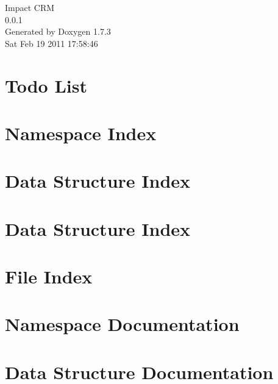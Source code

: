 \documentclass[a4paper]{book}
\begin{document}
\hypersetup{pageanchor=false}
\begin{titlepage}
\vspace*{7cm}
\begin{center}
{\Large Impact CRM \\[1ex]\large 0.0.1 }\\
\vspace*{1cm}
{\large Generated by Doxygen 1.7.3}\\
\vspace*{0.5cm}
{\small Sat Feb 19 2011 17:58:46}\\
\end{center}
\end{titlepage}
\clearemptydoublepage
{}
\tableofcontents
\clearemptydoublepage
{}
\hypersetup{pageanchor=true}
\chapter{Todo List}
\label{todo}
\hypertarget{todo}{}

\chapter{Namespace Index}

\chapter{Data Structure Index}

\chapter{Data Structure Index}

\chapter{File Index}

\chapter{Namespace Documentation}





\chapter{Data Structure Documentation}






















\end{document}
